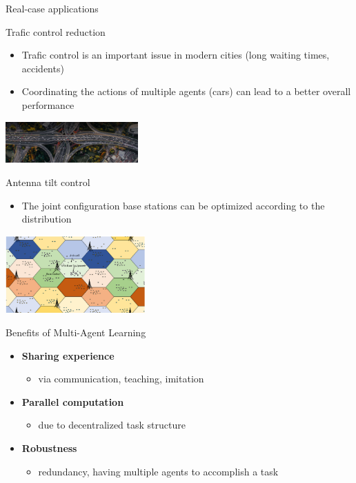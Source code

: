 \documentclass[presentation, 8pt]{beamer}\mode<presentation>{\usetheme{AMSBolognaFC}}
\begin{document}
\begin{frame}[allowframebreaks]{Real-case applications}

\begin{exampleblock}{Trafic control reduction}
	\begin{itemize}
		\item Trafic control is an important issue in modern cities (long waiting times, accidents)
		\item Coordinating the actions of multiple agents (cars) can lead to a better overall performance
	\end{itemize}
	\centering
	\includegraphics[width=0.38\textwidth]{img/traffic.jpg}
\end{exampleblock}
\begin{exampleblock}{Antenna tilt control}
	\begin{itemize}
		\item The joint configuration base stations can be optimized according to the distribution
	\end{itemize}
	\centering
	\includegraphics[width=0.4\textwidth]{img/antenna.png}
\end{exampleblock}
\end{frame}
\begin{frame}{Benefits of Multi-Agent Learning}
	\begin{itemize}
		\item \textbf{Sharing experience}
		\begin{itemize}
			\item via communication, teaching, imitation
		\end{itemize}
		\item \textbf{Parallel computation}
		\begin{itemize}
			\item due to decentralized task structure
		\end{itemize}
		\item \textbf{Robustness}
		\begin{itemize}
			\item redundancy, having multiple agents to accomplish a task
		\end{itemize}
	\end{itemize}
\end{frame}
\end{document}
